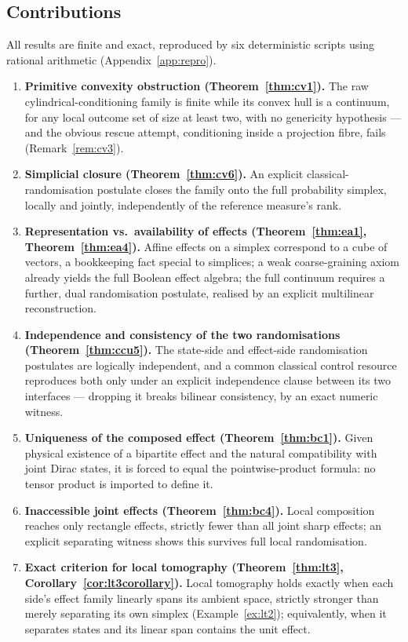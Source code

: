 \documentclass[11pt,a4paper]{article}
\begin{document}
  \subsection{Contributions}
    \label{ssec:contributions}

    All results are finite and exact, reproduced by six deterministic scripts using rational arithmetic
    (Appendix~\ref{app:repro}).

    \begin{enumerate}
      \item \textbf{Primitive convexity obstruction (Theorem~\ref{thm:cv1}).}
      The raw cylindrical-conditioning family is finite while its convex hull is a continuum, for any local
      outcome set of size at least two, with no genericity hypothesis --- and the obvious rescue attempt,
      conditioning inside a projection fibre, fails (Remark~\ref{rem:cv3}).
      \item \textbf{Simplicial closure (Theorem~\ref{thm:cv6}).}
      An explicit classical-randomisation postulate closes the family onto the full probability simplex,
      locally and jointly, independently of the reference measure's rank.
      \item \textbf{Representation vs.\ availability of effects (Theorem~\ref{thm:ea1}, Theorem~\ref{thm:ea4}).}
      Affine effects on a simplex correspond to a cube of vectors, a bookkeeping fact special to simplices;
      a weak coarse-graining axiom already yields the full Boolean effect algebra; the full continuum
      requires a further, dual randomisation postulate, realised by an explicit multilinear reconstruction.
      \item \textbf{Independence and consistency of the two randomisations (Theorem~\ref{thm:ccu5}).}
      The state-side and effect-side randomisation postulates are logically independent, and a common
      classical control resource reproduces both only under an explicit independence clause between its two
      interfaces --- dropping it breaks bilinear consistency, by an exact numeric witness.
      \item \textbf{Uniqueness of the composed effect (Theorem~\ref{thm:bc1}).}
      Given physical existence of a bipartite effect and the natural compatibility with joint Dirac states,
      it is forced to equal the pointwise-product formula: no tensor product is imported to define it.
      \item \textbf{Inaccessible joint effects (Theorem~\ref{thm:bc4}).}
      Local composition reaches only rectangle effects, strictly fewer than all joint sharp effects; an
      explicit separating witness shows this survives full local randomisation.
      \item \textbf{Exact criterion for local tomography (Theorem~\ref{thm:lt3}, Corollary~\ref{cor:lt3corollary}).}
      Local tomography holds exactly when each side's effect family linearly spans its ambient space,
      strictly stronger than merely separating its own simplex (Example~\ref{ex:lt2}); equivalently, when it
      separates states and its linear span contains the unit effect.
    \end{enumerate}
\end{document}
